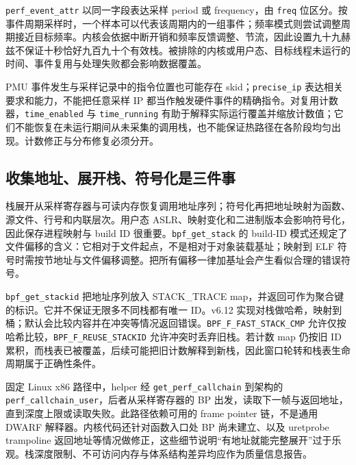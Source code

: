 \documentclass[UTF8,fontset=fandol,openany,11pt]{ctexbook}
\begin{document}
\texttt{perf\_\allowbreak{}event\_\allowbreak{}attr} 以同一字段表达采样 period 或 frequency，由 \texttt{freq} 位区分。按事件周期采样时，一个样本可以代表该周期内的一组事件；频率模式则尝试调整周期接近目标频率。内核会依据中断开销和频率反馈调整、节流，因此设置九十九赫兹不保证十秒恰好九百九十个有效栈。被排除的内核或用户态、目标线程未运行的时间、事件复用与处理失败都会影响数据覆盖。\cite{eb-perf-abi}\cite{eb-perf-core}


PMU 事件发生与采样记录中的指令位置也可能存在 skid；\texttt{precise\_\allowbreak{}ip} 表达相关要求和能力，不能把任意采样 IP 都当作触发硬件事件的精确指令。对复用计数器，\texttt{time\_\allowbreak{}enabled} 与 \texttt{time\_\allowbreak{}running} 有助于解释实际运行覆盖并缩放计数值；它们不能恢复在未运行期间从未采集的调用栈，也不能保证热路径在各阶段均匀出现。计数修正与分布修复必须分开。\cite{eb-perf-abi}


\subsection{收集地址、展开栈、符号化是三件事}

栈展开从采样寄存器与可读内存恢复调用地址序列；符号化再把地址映射为函数、源文件、行号和内联层次。用户态 ASLR、映射变化和二进制版本会影响符号化，因此保存进程映射与 build ID 很重要。\texttt{bpf\_\allowbreak{}get\_\allowbreak{}stack} 的 build-ID 模式还规定了文件偏移的含义：它相对于文件起点，不是相对于对象装载基址；映射到 ELF 符号时需按节地址与文件偏移调整。把所有偏移一律加基址会产生看似合理的错误符号。\cite{eb-stack-helper}


\texttt{bpf\_\allowbreak{}get\_\allowbreak{}stackid} 把地址序列放入 STACK\_\allowbreak{}TRACE map，并返回可作为聚合键的标识。它并不保证无限多不同栈都有唯一 ID。v6.12 实现对栈做哈希，映射到桶；默认会比较内容并在冲突等情况返回错误。\texttt{BPF\_\allowbreak{}F\_\allowbreak{}FAST\_\allowbreak{}STACK\_\allowbreak{}CMP} 允许仅按哈希比较，\texttt{BPF\_\allowbreak{}F\_\allowbreak{}REUSE\_\allowbreak{}STACKID} 允许冲突时丢弃旧栈。若计数 map 仍按旧 ID 累积，而栈表已被覆盖，后续可能把旧计数解释到新栈，因此窗口轮转和栈表生命周期属于正确性条件。\cite{eb-stack-helper}\cite{eb-stackmap}


固定 Linux x86 路径中，helper 经 \texttt{get\_\allowbreak{}perf\_\allowbreak{}callchain} 到架构的 \texttt{perf\_\allowbreak{}callchain\_\allowbreak{}user}，后者从采样寄存器的 BP 出发，读取下一帧与返回地址，直到深度上限或读取失败。此路径依赖可用的 frame pointer 链，不是通用 DWARF 解释器。内核代码还针对函数入口处 BP 尚未建立、以及 uretprobe trampoline 返回地址等情况做修正，这些细节说明“有地址就能完整展开”过于乐观。栈深度限制、不可访问内存与体系结构差异均应作为质量信息报告。\cite{eb-stackmap}\cite{eb-callchain}\cite{eb-x86-callchain}
\end{document}

